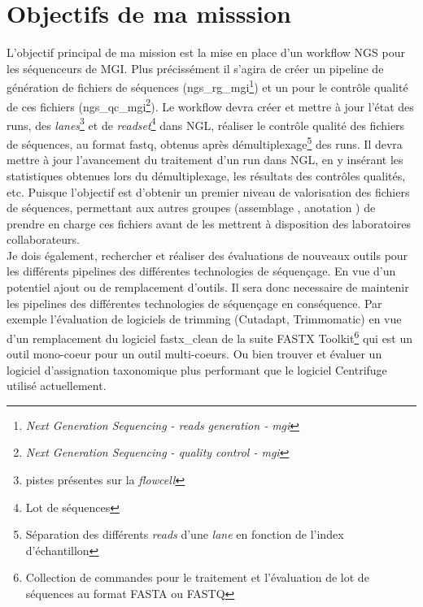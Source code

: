 \section{Objectifs de ma misssion}
L'objectif principal de ma mission est la mise en place d'un workflow NGS pour les séquenceurs de MGI. Plus précissément il s'agira de créer un pipeline de génération de fichiers de séquences (ngs\_rg\_mgi\footnote{\emph{Next Generation Sequencing - reads generation - mgi}}) et un pour le contrôle qualité de ces fichiers (ngs\_qc\_mgi\footnote{\emph{Next Generation Sequencing - quality control - mgi}}). Le workflow devra créer et mettre à jour l'état des runs, des \emph{lanes}\footnote{pistes présentes sur la \emph{flowcell}} et de \emph{readset}\footnote{Lot de séquences} dans NGL, réaliser le contrôle qualité des fichiers de séquences, au format fastq, obtenus après démultiplexage\footnote{Séparation des différents \emph{reads} d'une \emph{lane} en fonction de l'index d'échantillon} des runs. Il devra mettre à jour l'avancement du traitement d'un run dans NGL, en y insérant les statistiques obtenues lors du démultiplexage, les résultats des contrôles qualités, etc. Puisque l'objectif est d'obtenir un premier niveau de valorisation des fichiers de séquences, permettant aux autres groupes (\og assemblage \fg{}, \og anotation \fg{}) de prendre en charge ces fichiers avant de les mettrent à disposition des laboratoires collaborateurs.\\

Je dois également, rechercher et réaliser des évaluations de nouveaux outils pour les différents pipelines des différentes technologies de séquençage. En vue d'un potentiel ajout ou de remplacement d'outils. Il sera donc necessaire de maintenir les pipelines des différentes technologies de séquençage en conséquence. Par exemple l'évaluation de logiciels de trimming (Cutadapt, Trimmomatic) en vue d'un remplacement du logiciel fastx\_clean de la suite FASTX Toolkit\footnote{Collection de commandes pour le traitement et l'évaluation de lot de séquences au format FASTA ou FASTQ} qui est un outil mono-coeur pour un outil multi-coeurs. Ou bien trouver et évaluer un logiciel d'assignation taxonomique plus performant que le logiciel Centrifuge utilisé actuellement.